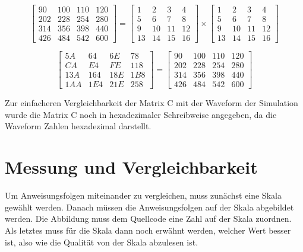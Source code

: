 \[ \begin{bmatrix}
         90 & 100 & 110 & 120\\
         202 & 228 & 254 & 280\\
         314 & 356  & 398 & 440\\
         426 & 484 & 542 & 600
     \end{bmatrix}
     =
\begin{bmatrix}
         1 & 2 & 3 & 4\\
         5 & 6 & 7 & 8\\
         9 & 10 & 11 & 12\\
         13 & 14 & 15 & 16
     \end{bmatrix}
     \times
     \begin{bmatrix}
         1 & 2 & 3 & 4\\
         5 & 6 & 7 & 8\\
         9 & 10 & 11 & 12\\
         13 & 14 & 15 & 16
     \end{bmatrix} \]

     \[ \begin{bmatrix}
         5A & 64 & 6E & 78\\
         CA & E4 & FE & 118\\
         13A & 164 & 18E & 1B8\\
         1AA & 1E4 & 21E & 258
     \end{bmatrix}
     =
     \begin{bmatrix}
         90 & 100 & 110 & 120\\
         202 & 228 & 254 & 280\\
         314 & 356  & 398 & 440\\
         426 & 484 & 542 & 600
     \end{bmatrix}  \]

Zur einfacheren Vergleichbarkeit der Matrix C mit der Waveform der Simulation wurde die Matrix C noch in hexadezimaler Schreibweise angegeben, da die Waveform Zahlen hexadezimal darstellt.




\section{Messung und Vergleichbarkeit} \label{sec:measure_and_compare}

Um Anweisungsfolgen miteinander zu vergleichen, muss zunächst eine Skala gewählt werden. Danach müssen die Anweisungsfolgen auf der Skala abgebildet werden. Die Abbildung muss dem Quellcode eine Zahl auf der Skala zuordnen. Als letztes muss für die Skala dann noch erwähnt werden, welcher Wert besser ist, also wie die Qualität von der Skala abzulesen ist.


